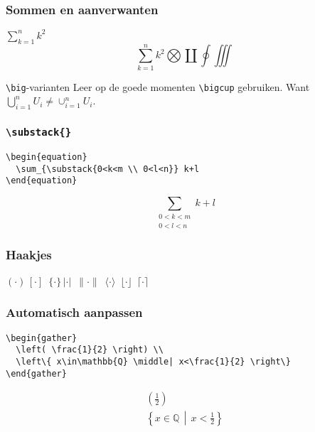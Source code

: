 \begin{frame}[fragile]
  \frametitle{Sommen en aanverwanten}

\begin{LTXexample}
$\sum_{k=1}^n k^2$ \\
\begin{equation}
  \sum_{k=1}^n k^2
  \bigotimes \coprod
  \oint \iiint
\end{equation}
\end{LTXexample}

\begin{alertblock}{\texttt{\textbackslash big}-varianten}
  Leer op de goede momenten \verb|\bigcup| gebruiken. Want $\bigcup_{i=1}^n U_i\neq \cup_{i=1}^n U_i$.
\end{alertblock}
\end{frame}

\begin{frame}[fragile]
  \frametitle{\texttt{\textbackslash substack\{\}}}

  \begin{verbatim}
\begin{equation}
  \sum_{\substack{0<k<m \\ 0<l<n}} k+l
\end{equation}
  \end{verbatim}
\begin{equation}
  \sum_{\substack{0<k<m \\ 0<l<n}} k+l
\end{equation}
\end{frame}

\begin{frame}[fragile]
  \frametitle{Haakjes}

  \begin{LTXexample}
$(\cdot) \, [\cdot] \,$
$\{\cdot\}\, |\cdot| \,$
$\|\cdot\| \,$
$\langle\cdot\rangle \,$
$\lfloor\cdot\rfloor \,$
$\lceil\cdot\rceil$
  \end{LTXexample}
\end{frame}

\begin{frame}[fragile]
  \frametitle{Automatisch aanpassen}

  \begin{verbatim}
\begin{gather}
  \left( \frac{1}{2} \right) \\
  \left\{ x\in\mathbb{Q} \middle| x<\frac{1}{2} \right\}
\end{gather}
\end{verbatim}
\begin{gather}
  \left( \frac{1}{2} \right) \\
  \left\{ x\in\mathbb{Q} \,\middle|\, x<\frac{1}{2} \right\}
\end{gather}
\end{frame}

